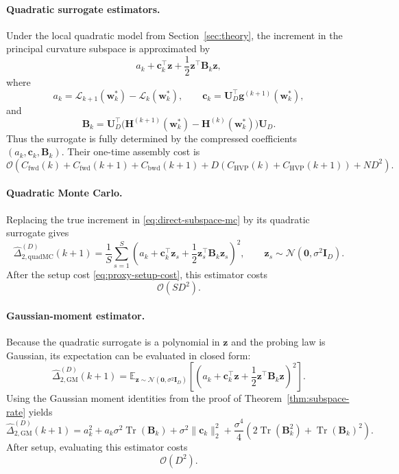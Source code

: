 \documentclass[10pt]{article}
\theoremstyle{plain}
\theoremstyle{remark}
\begin{document}
\paragraph{Quadratic surrogate estimators.}
Under the local quadratic model from Section~\ref{sec:theory}, the increment in the principal curvature subspace is approximated by
\[
a_k + \mathbf c_k^\top \mathbf z + \frac12 \mathbf z^\top \mathbf B_k \mathbf z,
\]
where
\[
a_k = \mathcal L_{k+1}(\mathbf w_k^*)-\mathcal L_k(\mathbf w_k^*),\qquad
\mathbf c_k = \mathbf U_D^\top \mathbf g^{(k+1)}(\mathbf w_k^*),
\]
and
\[
\mathbf B_k
=
\mathbf U_D^\top
\bigl(
\mathbf H^{(k+1)}(\mathbf w_k^*)-\mathbf H^{(k)}(\mathbf w_k^*)
\bigr)
\mathbf U_D.
\]
Thus the surrogate is fully determined by the compressed coefficients $(a_k,\mathbf c_k,\mathbf B_k)$.
Their one-time assembly cost is
\begin{equation}
\label{eq:proxy-setup-cost}
\mathcal O\!\left(
C_{\mathrm{fwd}}(k)+C_{\mathrm{fwd}}(k+1)
+
C_{\mathrm{bwd}}(k+1)
+
D(C_{\mathrm{HVP}}(k)+C_{\mathrm{HVP}}(k+1))
+
ND^2
\right).
\end{equation}

\paragraph{Quadratic Monte Carlo.}
Replacing the true increment in \eqref{eq:direct-subspace-mc} by its quadratic surrogate gives
\begin{equation}
\label{eq:quad-subspace-mc}
\widehat{\Delta}_{2,\mathrm{quadMC}}^{(D)}(k+1)
=
\frac{1}{S}\sum_{s=1}^S
\left(
a_k + \mathbf c_k^\top \mathbf z_s + \frac12 \mathbf z_s^\top \mathbf B_k \mathbf z_s
\right)^2,
\qquad
\mathbf z_s \sim \mathcal N(\mathbf 0,\sigma^2\mathbf I_D).
\end{equation}
After the setup cost \eqref{eq:proxy-setup-cost}, this estimator costs
\[
\mathcal O(SD^2).
\]

\paragraph{Gaussian-moment estimator.}
Because the quadratic surrogate is a polynomial in $\mathbf z$ and the probing law is Gaussian, its expectation can be evaluated in closed form:
\begin{equation}
\label{eq:quad-closed-form}
\widehat{\Delta}_{2,\mathrm{GM}}^{(D)}(k+1)
=
\mathbb E_{\mathbf z\sim\mathcal N(\mathbf 0, \sigma^2 \mathbf I_D)}
\left[
\left(
a_k + \mathbf c_k^\top \mathbf z + \frac12 \mathbf z^\top \mathbf B_k \mathbf z
\right)^2
\right].
\end{equation}
Using the Gaussian moment identities from the proof of Theorem~\ref{thm:subspace-rate} yields
\begin{equation}
\label{eq:quad-closed-form-expanded}
\widehat{\Delta}_{2,\mathrm{GM}}^{(D)}(k+1)
=
a_k^2
+
a_k \sigma^2 \operatorname{Tr}(\mathbf B_k)
+
\sigma^2 \|\mathbf c_k\|_2^2
+
\frac{\sigma^4}{4}
\left(
2\operatorname{Tr}(\mathbf B_k^2)
+
\operatorname{Tr}(\mathbf B_k)^2
\right).
\end{equation}
After setup, evaluating this estimator costs
\[
\mathcal O(D^2).
\]
\end{document}
